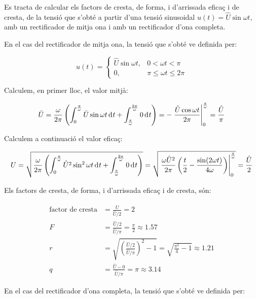 \begin{exemple}[\FactorsCrestaFormaArr{}]
	\addcontentsxms{\FactorsCrestaFormaArr}
    Es tracta de calcular els factors de cresta, de forma, i d'arrissada eficaç i de cresta,
    de la tensió  que s'obté a partir d'una tensió sinusoidal
    $u(t) = \hat{U} \sin\omega t$, amb un rectificador de mitja ona i
    amb un rectificador d'ona completa.

    En el cas del rectificador de mitja ona, la tensió que s'obté ve
    definida per:
    
    \[
    u(t) = \begin{cases} \hat{U} \sin\omega t, & 0 < \omega t < \pi\\
           0, & \pi \leq \omega t \leq 2\pi \end{cases}
    \]

    Calculem, en primer lloc, el valor mitjà:
    
    \[
    \bar{U} = \frac{\omega}{2\pi} \left( \int_0^\frac{\pi}{\omega}
    \hat{U} \sin\omega t \diff t +
    \int_\frac{\pi}{\omega}^\frac{2\pi}{\omega} 0 \diff t \right) = -
    \left. \frac{\hat{U} \cos\omega t}{2\pi}
    \right|_0^\frac{\pi}{\omega} = \frac{\hat{U}}{\pi}
    \]

    Calculem a continuació el valor eficaç:
    
    \[
    U = \sqrt{\frac{\omega}{2\pi} \left( \int_0^\frac{\pi}{\omega}
    \hat{U}^2 \sin^2\omega t \diff t +
    \int_\frac{\pi}{\omega}^\frac{2\pi}{\omega} 0 \diff t \right)} =
      \sqrt{\left.\frac{\omega \hat{U}^2}{2\pi}\left( \frac{t}{2} -
    \frac{\sin (2\omega t)}{4\omega}
    \right)\right|_0^\frac{\pi}{\omega}} = \frac{\hat{U}}{2}
    \]

    Els factors de cresta, de forma, i d'arrissada eficaç i de cresta, són:
    
    \begin{align*}
        \text{factor de cresta} &= \frac{\hat{U}}{\hat{U}/2} = 2 \\[2ex]
        F &= \frac{\hat{U}/2}{\hat{U}/\pi} =\frac{\pi}{2} \approx
        \num{1,57} \\[2ex]
        r &= \sqrt{\left(\frac{\hat{U}/2}{\hat{U}/\pi}\right)^2-1} =
    \sqrt{\frac{\pi^2}{4}-1} \approx \num{1,21} \\[21ex]
        q &= \frac{\hat{U} - 0}{\hat{U}/\pi} = \pi \approx \num{3,14}
    \end{align*}


    En el cas del rectificador d'ona completa, la tensió que s'obté ve
    definida per:
    

\end{exemple}
